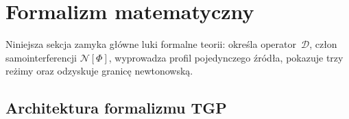 %
%
%
%
\section{Formalizm matematyczny}\label{sec:formalizm}

Niniejsza sekcja zamyka g\l{}\'owne luki formalne teorii:
okre\'sla operator~$\mathcal{D}$, cz\l{}on samointerferencji
$\mathcal{N}[\Phi]$, wyprowadza profil pojedynczego \'zr\'od\l{}a,
pokazuje trzy re\.zimy oraz odzyskuje granic\k{e} newtonowsk\k{a}.

\subsection{Architektura formalizmu TGP}\label{ssec:architektura}

